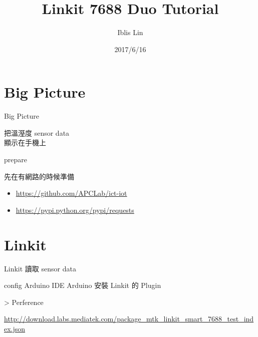 \documentclass{beamer}
\begin{document}
\title[Linkit 7688 Duo Tutorial]{Linkit 7688 Duo Tutorial}

\author{Iblis Lin}

\date{2017/6/16}

\begin{frame}
  \titlepage
\end{frame}


\section{Big Picture}

\begin{frame}{Big Picture}
  \begin{center}
    \Huge
    把溫溼度 sensor data \\
    顯示在手機上
  \end{center}
\end{frame}


\begin{frame}{prepare}
  \begin{center}
    \Large
    先在有網路的時候準備
  \end{center}

  \begin{itemize}
    \item \url{https://github.com/APCLab/ict-iot}

    \item \url{https://pypi.python.org/pypi/requests}
  \end{itemize}
\end{frame}


\section{Linkit}

\begin{frame}
  \begin{center}
    \Huge
    Linkit 讀取 sensor data
  \end{center}
\end{frame}

\begin{frame}{config Arduino IDE}
  Arduino 安裝 Linkit 的 Plugin

  > Perference

  \url{http://download.labs.mediatek.com/package_mtk_linkit_smart_7688_test_index.json}
\end{frame}
\end{document}
